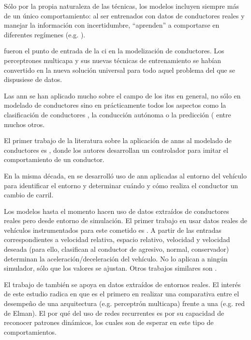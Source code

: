 Sólo por la propia naturaleza de las técnicas, los modelos incluyen siempre más de un único comportamiento: al ser entrenados con datos de conductores reales y manejar la información con incertidumbre, \enquote{aprenden} a comportarse en diferentes regímenes (e.g. \textit{}).

 fueron el punto de entrada de la \gls{ci} en la modelización de conductores. Los perceptrones multicapa y sus nuevas técnicas de entrenamiento se habían convertido en la nueva solución universal para todo aquel problema del que se dispusiese de datos.

Las \gls{ann} se han aplicado mucho sobre el campo de los \glspl{its} en general, no sólo en modelado de conductores sino en prácticamente todos los aspectos como la clasificación de conductores \cite{DiazAlvarez2014}, la conducción autónoma \cite{huval2015empirical} o la predicción (\cite{Dougherty1993, chan2012neural} entre muchos otros.

El primer trabajo de la literatura sobre la aplicación de \glspl{ann} al modelado de conductores es \cite{Fix1990}, donde los autores desarrollan un controlador para imitar el comportamiento de un conductor.

En la misma década, en \cite{Hunt1994} se desarrolló uso de \gls{ann} aplicadas al entorno del vehículo para identificar el entorno y determinar cuándo y cómo realiza el conductor un cambio de carril.

Los modelos hasta el momento hacen uso de datos extraídos de conductores reales pero desde entorno de simulación. El primer trabajo en usar datos reales de vehículos instrumentados para este cometido es \cite{Jia2003}. A partir de las entradas correspondientes a velocidad relativa, espacio relativo, velocidad y velocidad deseada (para ello, clasifican al conductor de agresivo, normal, conservador) determinan la aceleración/deceleración del vehículo. No lo aplican a ningún simulador, sólo que los valores se ajustan. Otros trabajos similares son \cite{Panwai2007, Khodayari2012}.

El trabajo de \cite{Simonelli2009} también se apoya en datos extraídos de entornos reales. El interés de este estudio radica en que es el primero en realizar una comparativa entre el desempeño de una arquitectura \textit{} (e.g. perceptrón multicapa) frente a una  (e.g. red de Elman). El por qué del uso de redes recurrentes es por su capacidad de reconocer patrones dinámicos, los cuales son de esperar en este tipo de comportamientos.

